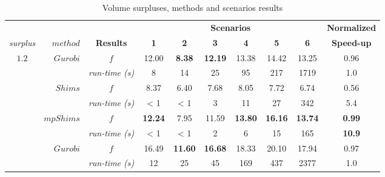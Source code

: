 \documentclass[preprint,authoryear]{elsarticle}
\begin{document}
\begin{table}[H]
\centering
\caption{Volume surpluses, methods and scenarios results}  \label{tab:results}
\footnotesize
\begin{tabular}{crcccccccc}
\toprule
&                          &                     &\multicolumn{6}{c}{\bf Scenarios}                                                                        &{\bf Normalized}\\
                                                 \cmidrule{4-9}		
{\it surplus}         & {$method$}               & {\bf Results}      &{\bf 1}      &{\bf 2}      &{\bf 3}      &{\bf 4}      &{\bf 5}       &{\bf 6}      &{\bf Speed-up} \\
\toprule


\multirow{7}{*}{$1.2$}&\multirow{2}{*}{ $Gurobi$}& $f$                & 12.00       & {\bf 8.38}  & {\bf 12.19} & 13.38       &  14.42      & 13.25        & 0.96 \\%
&                                                & {\it run-time (s)} &  8          &   14        &  25         &  95         &    217      &  1719        & 1.0  \\%

\cmidrule{2-10}		                       
&\multirow{2}{*}{ $Shims$}                       & $f$                & 8.37        &  6.40       &  7.68       &  8.05       &   7.72      & 6.74         & 0.56 \\%
&                                                & {\it run-time (s)} &  < 1        &  < 1        &    3        &   11        &   27        &  342         & 5.4   \\%

\cmidrule{2-10}		                       
&\multirow{2}{*}{ $mpShims$}                     & $f$                & {\bf 12.24} &  7.95       &  11.59      & {\bf 13.80} & {\bf 16.16} & {\bf 13.74}  & {\bf 0.99} \\%
&                                                & {\it run-time (s)} &  < 1        &  < 1        &    2        &   6         &    15       &   165        & {\bf 10.9}  \\%

\midrule

\multirow{7}{*}{$1.5$}&\multirow{2}{*}{ $Gurobi$}& $f$                & 16.49       & {\bf 11.60} & {\bf 16.68} & 18.33       &  20.10      & 17.94        & 0.97  \\%
&                                                & {\it run-time (s)} &  12         &   25        &  45         &  169        &   437       &  2377        & 1.0  \\%


\end{tabular}
\end{table}
\end{document}
